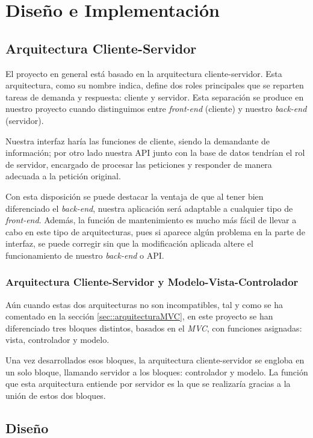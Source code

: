 \chapter{Diseño e Implementación}

\section{Arquitectura Cliente-Servidor}

El proyecto en general está basado en la arquitectura cliente-servidor\cite{clienteservidor}. Esta arquitectura, como su nombre indica, define dos roles principales que se reparten tareas de demanda y respuesta: cliente y servidor. Esta separación se produce en nuestro proyecto cuando distinguimos entre \textit{front-end} (cliente) y nuestro \textit{back-end} (servidor).

Nuestra interfaz haría las funciones de cliente, siendo la demandante de información; por otro lado nuestra API junto con la base de datos tendrían el rol de servidor, encargado de procesar las peticiones y responder de manera adecuada a la petición original.

Con esta disposición se puede destacar la ventaja de que al tener bien diferenciado el \textit{back-end}, nuestra aplicación será adaptable a cualquier tipo de \textit{front-end}. Además, la función de mantenimiento es mucho más fácil de llevar a cabo en este tipo de arquitecturas, pues si aparece algún problema en la parte de interfaz, se puede corregir sin que la modificación aplicada altere el funcionamiento de nuestro \textit{back-end} o API.

\subsection{Arquitectura Cliente-Servidor y Modelo-Vista-Controlador}

Aún cuando estas dos arquitecturas no son incompatibles, tal y como se ha comentado en la sección \ref{sec::arquitecturaMVC}, en este proyecto se han diferenciado tres bloques distintos, basados en el \textit{MVC}, con funciones asignadas: vista, controlador y modelo. 

Una vez desarrollados esos bloques, la arquitectura cliente-servidor se engloba en un solo bloque, llamando servidor a los bloques: controlador y modelo. La función que esta arquitectura entiende por servidor es la que se realizaría gracias a la unión de estos dos bloques.

\section{Diseño}

